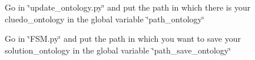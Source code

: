 Go in \char`\"{}update\+\_\+ontology.\+py\char`\"{} and put the path in which there is your cluedo\+\_\+ontology in the global variable \char`\"{}path\+\_\+ontology\char`\"{}

Go in \char`\"{}\+F\+S\+M.\+py\char`\"{} and put the path in which you want to save your solution\+\_\+ontology in the global variable \char`\"{}path\+\_\+save\+\_\+ontology\char`\"{} 